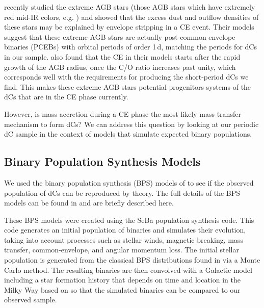 \documentclass[twocolumn]{aastex631}
\begin{document}
\citet{DellAgli2021} recently studied the extreme AGB stars (those AGB stars which have extremely red mid-IR colors, e.g. \citealt{Gruendl2008}) and showed that  the excess dust and outflow densities of these stars may be explained by envelope stripping in a CE event. Their models suggest that these extreme AGB stars are actually post-common-envelope binaries (PCEBs) with orbital periods of order 1\,d, matching the periods for dCs in our sample. \citet{DellAgli2021} also found that the CE in their models starts after the rapid growth of the AGB radius, once the C/O ratio increases past unity, which corresponds well with the requirements for producing the short-period dCs we find. This makes these extreme AGB stars potential progenitors systems of the dCs that are in the CE phase currently. 

However, is mass accretion during a CE phase the most likely mass transfer mechanism to form dCs? We can address this question by looking at our periodic dC sample in the context of models that simulate expected binary populations.

\subsection{Binary Population Synthesis Models}\label{subsec:bps}
We used the binary population synthesis (BPS) models of \citet{Toonen2013} to see if the observed population of dCs can be reproduced by theory. The full details of the BPS models can be found in \citet{Toonen2013} and are briefly described here. 

These BPS models were created using the SeBa \citep{Portegies1996, Nelemans2001, Toonen2012, Toonen2013} population synthesis code. This code generates an initial population of binaries and simulates their evolution, taking into account processes such as stellar winds, magnetic breaking, mass transfer, common-envelope, and angular momentum loss. The initial stellar population is generated from the classical BPS distributions found in \citet{Toonen2013} via a Monte Carlo method. The resulting binaries are then convolved with a Galactic model including a star formation history that depends on time and location in the Milky Way based on \citet{Boissier1999} so that the simulated binaries can be compared to our observed sample.
\end{document}

